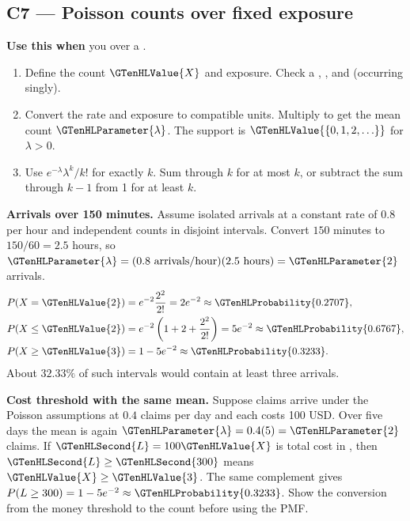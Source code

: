 \newpage
\subsection{C7 --- Poisson counts over fixed exposure}\label{crit:C7}
\textbf{Use this when} you  over a .

\begin{enumerate}
\item Define the count \(\GTenHLValue{X}\) and exposure. Check a , , and  (occurring singly).
\item Convert the rate and exposure to compatible units. Multiply to get the mean count \(\GTenHLParameter{\lambda}\). The support is \(\GTenHLValue{\{0,1,2,\ldots\}}\) for \(\lambda>0\).
\item Use \(e^{-\lambda}\lambda^k/k!\) for exactly \(k\). Sum through \(k\) for at most \(k\), or subtract the sum through \(k-1\) from 1 for at least \(k\).
\end{enumerate}

\textbf{Arrivals over 150 minutes.} Assume isolated arrivals at a constant rate of \(0.8\) per hour and independent counts in disjoint intervals. Convert \(150\) minutes to \(150/60=2.5\) hours, so \(\GTenHLParameter{\lambda}=(0.8\text{ arrivals/hour})(2.5\text{ hours})=\GTenHLParameter{2}\) arrivals.
\[
\begin{aligned}
P(X=\GTenHLValue{2})&=e^{-2}\frac{2^2}{2!}=2e^{-2}\approx\GTenHLProbability{0.2707},\\
P(X\leq\GTenHLValue{2})&=e^{-2}\left(1+2+\frac{2^2}{2!}\right)=5e^{-2}\approx\GTenHLProbability{0.6767},\\
P(X\geq\GTenHLValue{3})&=1-5e^{-2}\approx\GTenHLProbability{0.3233}.
\end{aligned}
\]
About \(32.33\%\) of such intervals would contain at least three arrivals.

\textbf{Cost threshold with the same mean.} Suppose claims arrive under the Poisson assumptions at \(0.4\) claims per day and each costs 100 USD. Over five days the mean is again \(\GTenHLParameter{\lambda}=0.4(5)=\GTenHLParameter{2}\) claims. If \(\GTenHLSecond{L}=100\GTenHLValue{X}\) is total cost in , then \(\GTenHLSecond{L}\geq\GTenHLSecond{300}\) means \(\GTenHLValue{X}\geq\GTenHLValue{3}\). The same complement gives \(P(L\geq300)=1-5e^{-2}\approx\GTenHLProbability{0.3233}\). Show the conversion from the money threshold to the count before using the PMF.

